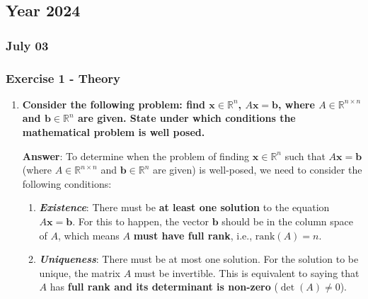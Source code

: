 \subsection{Year 2024}

\subsubsection{July 03}

\subsubsection*{Exercise 1 - Theory}

\begin{enumerate}[label=\textcolor{Green3}{\textbf{\arabic*.}}]
    \item \textcolor{Green3}{\textbf{%
        Consider the following problem: find $\mathbf{x} \in \mathbb{R}^{n}$, $A\mathbf{x} = \mathbf{b}$, where $A \in \mathbb{R}^{n \times n}$ and $\mathbf{b} \in \mathbb{R}^{n}$ are given. State under which conditions the mathematical problem is well posed.%
    }}

    \textbf{Answer}: To determine when the problem of finding $\mathbf{x} \in \mathbb{R}^{n}$ such that $A\mathbf{x} = \mathbf{b}$ (where $A \in \mathbb{R}^{n \times n}$ and $\mathbf{b} \in \mathbb{R}^n$ are given) is well-posed, we need to consider the following conditions:
    \begin{enumerate}
        \item \emph{\textbf{Existence}}: There must be \textbf{at least one solution} to the equation $A\mathbf{x} = \mathbf{b}$. For this to happen, the vector $\mathbf{b}$ should be in the column space of $A$, which means $A$ \textbf{must have full rank}, i.e., $\mathrm{rank}\left(A\right) = n$.
        
        \item \emph{\textbf{Uniqueness}}: There must be at most one solution. For the solution to be unique, the matrix $A$ must be invertible. This is equivalent to saying that $A$ has \textbf{full rank and its determinant is non-zero} ($\det(A) \neq 0$).
        

\end{enumerate}
\end{enumerate}
